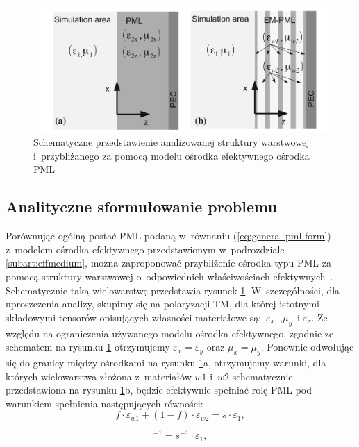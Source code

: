 \begin{figure}[tb]
	\includegraphics[width=\textwidth]{images/pml/oqe_schemat.png}
	\caption{Schematyczne przedstawienie analizowanej struktury warstwowej i~przybliżanego za pomocą modelu ośrodka efektywnego ośrodka PML}
	\label{fig:pml-multilay-schem}
\end{figure}

\subsection{Analityczne sformułowanie problemu}
Porównując ogólną postać PML podaną w~równaniu (\ref{eq:general-pml-form}) z~modelem ośrodka efektywnego przedstawionym w~podrozdziale \ref{subart:effmedium}, można zaproponować przybliżenie ośrodka typu PML za pomocą struktury warstwowej o~odpowiednich właściwościach efektywnych~\cite{ania2015}. Schematycznie taką wielowarstwę przedstawia rysunek \ref{fig:pml-multilay-schem}. W~szczególności, dla uproszczenia analizy, skupimy się na polaryzacji TM, dla której istotnymi składowymi tensorów opisujących własności materiałowe są:~$\varepsilon_x$~,$\mu_y$~i $\varepsilon_z$. Ze względu na ograniczenia używanego modelu ośrodka efektywnego, zgodnie ze schematem na rysunku \ref{fig:pml-multilay-schem} otrzymujemy $\varepsilon_x=\varepsilon_y$ oraz $\mu_x=\mu_y$. Ponownie odwołując się do granicy między ośrodkami na rysunku \ref{fig:pml-multilay-schem}a, otrzymujemy warunki, dla których wielowarstwa złożona z~materiałów $w1$ i~$w2$ schematycznie przedstawiona na rysunku \ref{fig:pml-multilay-schem}b, będzie efektywnie spełniać rolę PML pod warunkiem spełnienia następujących równości:
\begin{equation}
	f\cdot \varepsilon_{w1} + (1-f)\cdot \varepsilon_{w2} = s \cdot \varepsilon_1,
	\label{eq:oqe4}
\end{equation}

\begin{equation}
	[f\cdot \varepsilon_{w1}^{-1}+(1-f)\varepsilon_{w2}^{-1}]^{-1}=s^{-1}\cdot \varepsilon_1,
	\label{eq:oqe5}
\end{equation}

